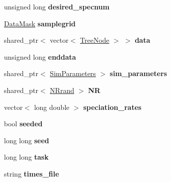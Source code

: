 \begin{DoxyCompactItemize}
\item 
unsigned long {\bfseries desired\+\_\+specnum}\hypertarget{class_spatial_tree_a694c7eb6c70687ea87e49066a8957877}{}\label{class_spatial_tree_a694c7eb6c70687ea87e49066a8957877}

\item 
\hyperlink{class_data_mask}{Data\+Mask} {\bfseries samplegrid}\hypertarget{class_spatial_tree_ad902e850c9573b5c26ef6d77a203f72d}{}\label{class_spatial_tree_ad902e850c9573b5c26ef6d77a203f72d}

\item 
shared\+\_\+ptr$<$ vector$<$ \hyperlink{class_tree_node}{Tree\+Node} $>$ $>$ {\bfseries data}\hypertarget{class_tree_a959e6513ebc4e0dba488349a644e909a}{}\label{class_tree_a959e6513ebc4e0dba488349a644e909a}

\item 
unsigned long {\bfseries enddata}\hypertarget{class_tree_a50344999e6b64d15eef935b1f6023471}{}\label{class_tree_a50344999e6b64d15eef935b1f6023471}

\item 
shared\+\_\+ptr$<$ \hyperlink{struct_sim_parameters}{Sim\+Parameters} $>$ {\bfseries sim\+\_\+parameters}\hypertarget{class_tree_aa838b517c44d9693f8b485c57989097f}{}\label{class_tree_aa838b517c44d9693f8b485c57989097f}

\item 
shared\+\_\+ptr$<$ \hyperlink{class_n_rrand}{N\+Rrand} $>$ {\bfseries NR}\hypertarget{class_tree_a20790866da998f8cb7d0f1455d9fbcc5}{}\label{class_tree_a20790866da998f8cb7d0f1455d9fbcc5}

\item 
vector$<$ long double $>$ {\bfseries speciation\+\_\+rates}\hypertarget{class_tree_a61b4349fe78d09ac06eff4b7d6833105}{}\label{class_tree_a61b4349fe78d09ac06eff4b7d6833105}

\item 
bool {\bfseries seeded}\hypertarget{class_tree_a78935befd45946b8e69023bffca59c1d}{}\label{class_tree_a78935befd45946b8e69023bffca59c1d}

\item 
long long {\bfseries seed}\hypertarget{class_tree_a821c3c83d8bad2a6c3dba687533f6a53}{}\label{class_tree_a821c3c83d8bad2a6c3dba687533f6a53}

\item 
long long {\bfseries task}\hypertarget{class_tree_a5f74fd75a2d2a606703b19a3a2d177d2}{}\label{class_tree_a5f74fd75a2d2a606703b19a3a2d177d2}

\item 
string {\bfseries times\+\_\+file}\hypertarget{class_tree_a5e031ea8d94f48288547116a9e7d7add}{}\label{class_tree_a5e031ea8d94f48288547116a9e7d7add}


\end{DoxyCompactItemize}
